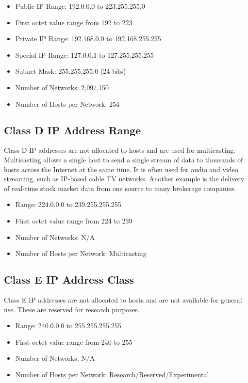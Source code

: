 \documentclass[a4paper,12pt]{book}
\begin{document}
\begin{itemize}
\item{Public IP Range: 192.0.0.0 to 223.255.255.0}
\item{First octet value range from 192 to 223}
\item{Private IP Range: 192.168.0.0 to 192.168.255.255}
\item{Special IP Range: 127.0.0.1 to 127.255.255.255}
\item{Subnet Mask: 255.255.255.0 (24 bits)}
\item{Number of Networks: 2,097,150}
\item{Number of Hosts per Network: 254}
\end{itemize}
\clearpage
\subsection{Class D IP Address Range}
Class D IP addresses are not allocated to hosts and are used for multicasting. Multicasting allows a single host to send a single stream of data to thousands of hosts across the Internet at the same time. It is often used for audio and video streaming, such as IP-based cable TV networks. Another example is the delivery of real-time stock market data from one source to many brokerage companies.

\begin{itemize}
\item{Range: 224.0.0.0 to 239.255.255.255}
\item{First octet value range from 224 to 239}
\item{Number of Networks: N/A}
\item{Number of Hosts per Network: Multicasting}
\end{itemize}


\subsection{Class E IP Address Class}
Class E IP addresses are not allocated to hosts and are not available for general use. These are reserved for research purposes.

\begin{itemize}
\item{Range: 240.0.0.0 to 255.255.255.255}
\item{First octet value range from 240 to 255}
\item{Number of Networks: N/A}
\item{Number of Hosts per Network: Research/Reserved/Experimental}
\end{itemize}
\end{document}
